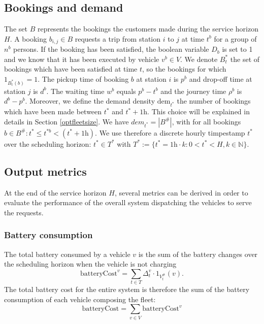 \documentclass[12pt,a4paper]{article}
\begin{document}
\subsection{Bookings and demand}\label{bookings}
The set $B$ represents the bookings the customers made during the service horizon $H$. A booking $b_{i,j} \in B$ requests a trip from station $i$ to $j$ at time $t^{b}$ for a group of $n^{b}$ persons. If the booking has been satisfied, the boolean variable $D_{b}$ is set to 1 and we know that it has been executed by vehicle $v^{b} \in V$. We denote $B^{*}_{t}$ the set of bookings which have been satisfied at time $t$, so the bookings for which $1_{B^{*}_{t}(b)} = 1$.  The pickup time of booking $b$ at station $i$ is $p^{b}$ and drop-off time at station $j$ is $d^{b}$. The waiting time $w^{b}$ equals $p^{b} - t^{b}$ and the journey time $\rho^{b}$ is $d^{b} - p^{b}$. Moreover, we define the demand density $\text{dem}_{t^{*}}$ the number of bookings which have been made between $t^{*}$ and $t^{*} + 1\text{h}$. This choice will be explained in details in Section \ref{optfleetsize}. We have $dem_{t^{*}} = |B^{\#}|$, with for all bookings $b \in B^{\#}: t^{*} \leq t^{*b} < (t^{*}+1\text{h})$. We use therefore a discrete hourly timpestamp $t^{*}$ over the scheduling horizon: $t^{*} \in T^{*}$ with $T^{*} := \{t^{*} = 1\text{h} \cdot k: 0 < t^{*} < H, k \in \mathbb{N}\}$.

\subsection{Output metrics}\label{metrics}
At the end of the service horizon $H$, several metrics can be derived in order to evaluate the performance of the overall system dispatching the vehicles to serve the requests. 

\subsubsection{Battery consumption}
The total battery consumed by a vehicle $v$ is the sum of the battery changes over the scheduling horizon when the vehicle is not charging
$$\text{batteryCost}^{v} = \sum_{t \in T}\Delta^{v}_{t} \cdot 1_{V^{\#}_{t}}(v) .$$
The total battery cost for the entire system is therefore the sum of the battery consumption of each vehicle composing the fleet:
$$\text{batteryCost} = \sum_{v \in V}\text{batteryCost}^{v}$$
\end{document}
